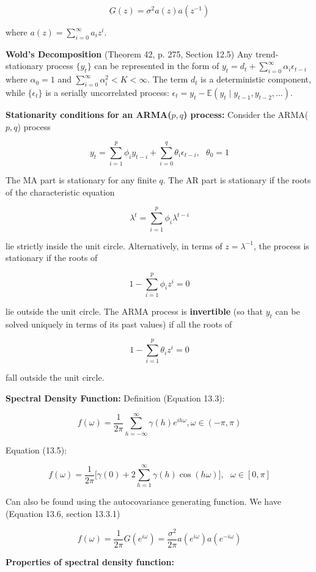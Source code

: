 \documentclass{article}
\newcommand{\E}{\mathbb{E}}
\begin{document}
\[
G(z) = \sigma^2 a(z)a(z^{-1})
\]

where \(a(z) = \sum_{i=0}^\infty a_i z^i\). 

\textbf{Wold's Decomposition} (Theorem 42, p. 275, Section 12.5) Any trend-stationary process \(\{y_t\}\) can be represented in the form of \(y_t = d_t + \sum_{i=0}^\infty \alpha_i \epsilon_{t-i}\) where \(\alpha_0 = 1\) and \(\sum_{i=0}^\infty \alpha_i^2 < K < \infty\). The term \(d_t\) is a deterministic component, while \(\{\epsilon_t\}\) is a serially uncorrelated process: \(\epsilon_t = y_t - \E(y_t \mid y_{t-1}, y_{t-2}, \ldots) \).

\textbf{Stationarity conditions for an ARMA(\(p,q\)) process:} Consider the ARMA(\(p, q\)) process 

\[
y_t = \sum_{i=1}^p \phi_i y_{t-i} + \sum_{i=0}^q \theta_i \epsilon_{t-i}, \ \ \ \theta_0 = 1
\]

The MA part is stationary for any finite \(q\). The AR part is stationary if the roots of the characteristic equation

\[
\lambda^t = \sum_{i=1}^p \phi_i \lambda^{t-i}
\]

lie strictly inside the unit circle. Alternatively, in terms of \(z = \lambda^{-1}\), the process is stationary if the roots of 

\[
1 - \sum_{i=1}^p \phi_i z^i = 0
\]

lie outside the unit circle. The ARMA process is \textbf{invertible} (so that \(y_t\) can be solved uniquely in terms of its past values) if all the roots of 

\[
1 - \sum_{i=1}^p \theta_i z^i = 0
\]

fall outside the unit circle.

\textbf{Spectral Density Function:} Definition (Equation 13.3):

\[
f(\omega) = \frac{1}{2 \pi} \sum_{h = - \infty}^\infty \gamma(h) e^{i h \omega}, \omega \in (-\pi, \pi)
\]

Equation (13.5):

\[
f(\omega) = \frac{1}{2\pi} \bigg[ \gamma(0) + 2 \sum_{h=1}^\infty \gamma(h) \cos(h \omega) \bigg], \ \ \ \omega \in [0, \pi]
\]

Can also be found using the autocovariance generating function. We have (Equation 13.6, section 13.3.1)

\[
f(\omega) = \frac{1}{2\pi}G(e^{i \omega}) = \frac{\sigma^2}{2 \pi} a(e^{i \omega}) a(e^{- i \omega})
\]

\textbf{Properties of spectral density function:}
\end{document}
